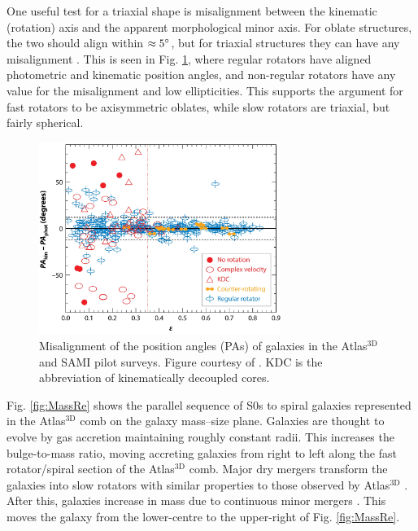 	One useful test for a triaxial shape is misalignment between the kinematic (rotation) axis and the apparent morphological minor axis. For oblate structures, the two should align within $\approx 5\degree$, but for triaxial structures they can have any misalignment \citep[e.g.][]{Contopoulos1956, Stark1977, Statler1987}. This is seen in Fig. \ref{fig:Misalignment}, where regular rotators have aligned photometric and kinematic position angles, and non-regular rotators have any value for the misalignment and low ellipticities. This supports the argument for fast rotators to be axisymmetric oblates, while slow rotators are triaxial, but fairly spherical.

	\begin{figure}
		\centering
		\includegraphics[width=0.7\textwidth]{introduction/misalignment.jpg}
		\caption[The kinematic--photometric misalignment in slow rotators]{Misalignment of the position angles (PAs) of galaxies in the Atlas$^\text{3D}$ and SAMI pilot surveys. Figure courtesy of \citet{Cappellari2016}. KDC is the abbreviation of kinematically decoupled cores.}
		\label{fig:Misalignment}
	\end{figure}

	Fig. \ref{fig:MassRe} shows the parallel sequence of S0s to spiral galaxies represented in the Atlas$^\text{3D}$ comb on the galaxy mass--size plane. Galaxies are thought to evolve by gas accretion maintaining roughly constant radii. This increases the bulge-to-mass ratio, moving accreting galaxies from right to left along the fast rotator/spiral section of the Atlas$^\text{3D}$ comb. Major dry mergers transform the galaxies into slow rotators \citep[e.g.][]{Bendo2000} with similar properties to those observed by Atlas$^\text{3D}$ \citep[e.g.][]{Jesseit2007, Jesseit2009}. After this, galaxies increase in mass due to continuous minor mergers \citep[e.g.][]{DeLucia2007, Genel2008, Feldmann2010, Oser2010, Feldmann2011, Hirschmann2012}. This moves the galaxy from the lower-centre to the upper-right of Fig. \ref{fig:MassRe}. 

